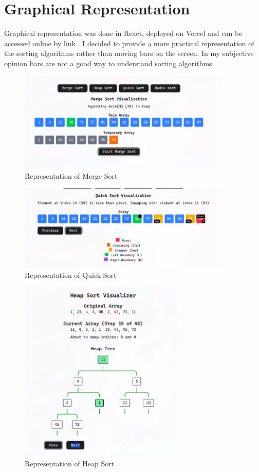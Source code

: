 \documentclass[12pt]{article}
\begin{document}
\clearpage
\section*{Graphical Representation}
\hspace{0.8cm}
Graphical representation was done in React, deployed on Vercel and can be accessed online by link \cite{site}.
I decided to provide a more practical representation of the sorting algorithms rather than moving bars on the
screen. In my subjective opinion bars are not a good way to understand sorting algorithms.
\begin{figure}[h]
    \centering
    \includegraphics[width=0.9\textwidth]{merge_im.png}
    \caption{Representation of Merge Sort}
\end{figure}

\begin{figure}[h]
    \centering
    \includegraphics[width=0.9\textwidth]{quick_im.png}
    \caption{Representation of Quick Sort}
\end{figure}

\begin{figure}[h]
    \centering
    \includegraphics[width=0.7\textwidth]{heap_im.png}
    \caption{Representation of Heap Sort}
\end{figure}
\end{document}
